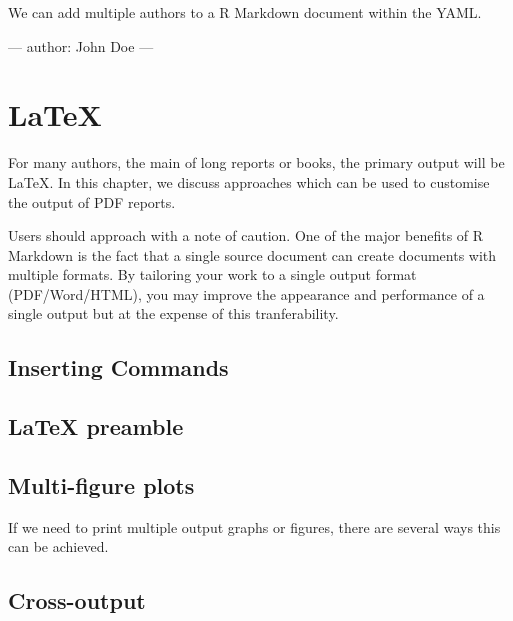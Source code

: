 \documentclass[]{book}
\newenvironment{Shaded}{\begin{snugshade}}{\end{snugshade}}
\newcommand{\AttributeTok}[1]{\textcolor[rgb]{0.77,0.63,0.00}{#1}}
\newcommand{\FunctionTok}[1]{\textcolor[rgb]{0.00,0.00,0.00}{#1}}
\newcommand{\OtherTok}[1]{\textcolor[rgb]{0.56,0.35,0.01}{#1}}
\theoremstyle{definition}
\theoremstyle{definition}
\theoremstyle{definition}
\theoremstyle{remark}
\begin{document}
We can add multiple authors to a R Markdown document within the YAML.

\begin{Shaded}
\begin{Highlighting}[]
\OtherTok{---}
\FunctionTok{author:}\AttributeTok{ John Doe}
\OtherTok{---}
\end{Highlighting}
\end{Shaded}

\hypertarget{latex}{%
\chapter{LaTeX}\label{latex}}

For many authors, the main of long reports or books, the primary output
will be LaTeX. In this chapter, we discuss approaches which can be used
to customise the output of PDF reports.

Users should approach with a note of caution. One of the major benefits
of R Markdown is the fact that a single source document can create
documents with multiple formats. By tailoring your work to a single
output format (PDF/Word/HTML), you may improve the appearance and
performance of a single output but at the expense of this
tranferability.

\hypertarget{inserting-commands}{%
\section{Inserting Commands}\label{inserting-commands}}

\hypertarget{latex-preamble}{%
\section{LaTeX preamble}\label{latex-preamble}}

\hypertarget{multi-figure-plots}{%
\section{Multi-figure plots}\label{multi-figure-plots}}

If we need to print multiple output graphs or figures, there are several
ways this can be achieved.

\hypertarget{cross-output}{%
\section{Cross-output}\label{cross-output}}
\end{document}

